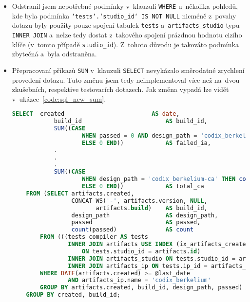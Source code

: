 \begin{itemize}[listparindent=1.55em, parsep=0em]
    \item Odstranil jsem nepotřebné podmínky v~klauzuli \texttt{WHERE} u~několika pohledů, kde byla podmínka
    \texttt{`tests`.`studio\_id` IS NOT NULL} nicméně z~povahy dotazu byly použity pouze spojení tabulek
    \texttt{tests} a~\texttt{artifacts\_studio} typu \texttt{INNER~JOIN} a~nelze tedy dostat z~takového spojení
    prázdnou hodnotu cizího klíče (v~tomto případě \texttt{studio\_id}). Z~tohoto důvodu je takováto podmínka
    zbytečná a~byla odstraněna.


    \item Přepracovaní příkazů \texttt{SUM} v~klauzuli \texttt{SELECT} nevykázalo směrodatné zrychlení provedení dotazu. Tuto změnu jsem tedy neimplementoval více než na~dvou zkušebních, respektive testovacích dotazech. Jak změna vypadá lze vidět v~ukázce~\ref{code:sql_new_sum}.

    \lstset{frame=single}
    \begin{lstlisting}[language=SQL, basicstyle=\footnotesize\ttfamily, label={code:sql_new_sum}, caption=Kód nového přístupu k~využití příkazu \protect\texttt{SUM} v~klauzuli \protect\texttt{SELECT}. Nejprve se provede předvýběr s~agregací potřebných atributů a~následně sloučení dílčích výsledků pro~získaní kompletních dat. Tento přístup ale nepřinesl výraznější zrychlení dotazu a~nebyl proto použit ve~více pohledech. Dále lze vidět použití \texttt{USE~INDEX~(ix\_artifacts\_created)}{,} což je nápověda pro MySQL optimalizátor.]
    SELECT  created                         AS date,
            build_id                        AS build_id,
            SUM((CASE
                    WHEN passed = 0 AND design_path = 'codix_berkelium-ia' THEN count
                    ELSE 0 END))            AS failed_ia,
            .
            .
            .
            SUM((CASE
                    WHEN design_path = 'codix_berkelium-ca' THEN count
                    ELSE 0 END))            AS total_ca
    FROM (SELECT artifacts.created,
                 CONCAT_WS('-', artifacts.version, NULL,
                        artifacts.build)    AS build_id,
                 design_path                AS design_path,
                 passed                     AS passed,
                 count(passed)              AS count
        FROM (((tests_compiler AS tests
                INNER JOIN artifacts USE INDEX (ix_artifacts_created)
                    ON tests.studio_id = artifacts.id)
                INNER JOIN artifacts_studio ON tests.studio_id = artifacts_studio.id)
                INNER JOIN artifacts_ip ON tests.ip_id = artifacts_ip.id)
        WHERE DATE(artifacts.created) >= @last_date
                AND artifacts_ip.name = 'codix_berkelium'
        GROUP BY artifacts.created, build_id, design_path, passed) AS t
    GROUP BY created, build_id;
    \end{lstlisting}



\end{itemize}

